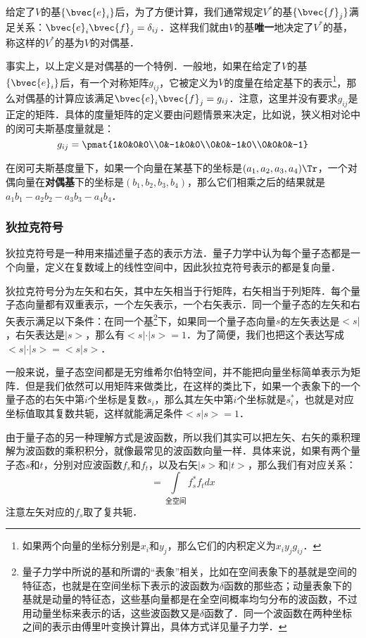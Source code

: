 给定了$V$的基$\{\bvec{e}_i\}$后，为了方便计算，我们通常规定$V^*$的基$\{\bvec{f}_j\}$满足关系：$\bvec{e}_i\bvec{f}_j=\delta_{ij}$．这样我们就由$V$的基\textbf{唯一}地决定了$V^*$的基，称这样的$V^*$的基为$V$的对偶基．

事实上，以上定义是对偶基的一个特例．一般地，如果在给定了$V$的基$\{\bvec{e}_i\}$后，有一个对称矩阵$g_{ij}$，它被定义为$V$的度量在给定基下的表示\footnote{如果两个向量的坐标分别是$x_i$和$y_j$，那么它们的内积定义为$x_iy_jg_{ij}$．}，那么对偶基的计算应该满足$\bvec{e}_i\bvec{f}_j=g_{ij}$．注意，这里并没有要求$g_{ij}$是正定的矩阵．具体的度量矩阵的定义要由问题情景来决定，比如说，狭义相对论中的闵可夫斯基度量就是：
\begin{equation}
g_{ij}=\pmat{1&0&0&0\\0&-1&0&0\\0&0&-1&0\\0&0&0&-1}
\end{equation}

在闵可夫斯基度量下，如果一个向量在某基下的坐标是$(a_1, a_2, a_3, a_4)\Tr$，一个对偶向量在\textbf{对偶基}下的坐标是$(b_1, b_2, b_3, b_4)$，那么它们相乘之后的结果就是$a_1b_1-a_2b_2-a_3b_3-a_4b_4$．



\subsubsection{狄拉克符号}

狄拉克符号是一种用来描述量子态的表示方法．量子力学中认为每个量子态都是一个向量，定义在复数域上的线性空间中，因此狄拉克符号表示的都是复向量．

狄拉克符号分为左矢和右矢，其中左矢相当于行矩阵，右矢相当于列矩阵．每个量子态向量都有双重表示，一个左矢表示，一个右矢表示．同一个量子态的左矢和右矢表示满足以下条件：在同一个基\footnote{量子力学中所说的基和所谓的“表象”相关，比如在空间表象下的基就是空间的特征态，也就是在空间坐标下表示的波函数为$\delta$函数的那些态；动量表象下的基就是动量的特征态，这些基向量都是在全空间概率均匀分布的波函数，不过用动量坐标来表示的话，这些波函数又是$\delta$函数了．同一个波函数在两种坐标之间的表示由傅里叶变换计算出，具体方式详见量子力学．}下，如果同一个量子态向量$s$的左矢表达是$<s|$，右矢表达是$|s>$，那么有$<s|\cdot|s>=1$．为了简便，我们也把这个表达写成$<s|\cdot|s>=<s|s>$．

一般来说，量子态空间都是无穷维希尔伯特空间，并不能把向量坐标简单表示为矩阵．但是我们依然可以用矩阵来做类比，在这样的类比下，如果一个表象下的一个量子态的右矢中第$i$个坐标是复数$s_i$，那么其左矢中第$i$个坐标就是$s_i^*$，也就是对应坐标值取其复数共轭，这样就能满足条件$<s|s>=1$．

由于量子态的另一种理解方式是波函数，所以我们其实可以把左矢、右矢的乘积理解为波函数的乘积积分，就像最常见的波函数向量一样．具体来说，如果有两个量子态$s$和$t$，分别对应波函数$f_s$和$f_t$，以及右矢$|s>$和$|t>$，那么我们有对应关系：
\begin{equation}<s|t>=\int\limits_{\text{全空间}}f_s^*f_tdx\end{equation}
注意左矢对应的$f_s$取了复共轭．









